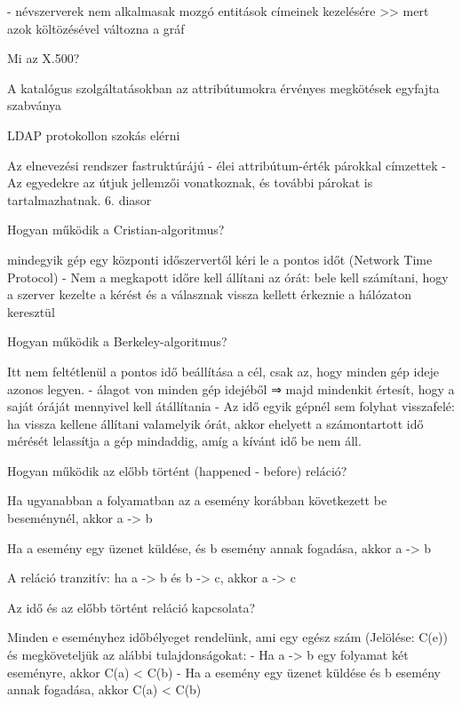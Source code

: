 \documentclass[12pt]{article}
\begin{document}
\begin{description}
            - névszerverek nem alkalmasak mozgó entitások címeinek kezelésére >>  mert azok költözésével változna a gráf
        \item  Mi az X.500?
        \item A katalógus szolgáltatásokban az attribútumokra érvényes megkötések egyfajta szabványa
        \item LDAP protokollon szokás elérni 
        \item Az elnevezési rendszer fastruktúrájú
            - élei attribútum-érték párokkal címzettek
            - Az egyedekre az útjuk jellemzői vonatkoznak, és további párokat is tartalmazhatnak.
            6. diasor
        \item  Hogyan működik a Cristian-algoritmus?
        \item mindegyik gép egy központi időszervertől kéri le a pontos időt (Network Time Protocol)	
            - Nem a megkapott időre kell állítani az órát: bele kell számítani, hogy 
            a szerver kezelte a kérést és a válasznak vissza kellett érkeznie a hálózaton keresztül
        \item  Hogyan működik a Berkeley-algoritmus?
        \item Itt nem feltétlenül a pontos idő beállítása a cél, csak az, hogy minden gép ideje azonos legyen.
            - álagot von minden gép idejéből
            ⇒ majd mindenkit értesít, hogy a saját óráját mennyivel kell átállítania
            - Az idő egyik gépnél sem folyhat visszafelé: ha vissza kellene állítani valamelyik órát,
            akkor ehelyett a számontartott idő mérését lelassítja a gép mindaddig, amíg a kívánt idő be nem áll.
        \item  Hogyan működik az előbb történt (happened - before) reláció?
        \item Ha ugyanabban a folyamatban az a esemény korábban következett be beseménynél, akkor a -> b
        \item Ha a esemény egy üzenet küldése, és b esemény annak fogadása, akkor a -> b
        \item A reláció tranzitív:  ha a -> b és b -> c, akkor a -> c
        \item  Az idő és az előbb történt reláció kapcsolata?
        \item Minden e eseményhez időbélyeget rendelünk, ami egy egész szám (Jelölése:  C(e)) és megköveteljük az alábbi tulajdonságokat:
            - Ha a -> b egy folyamat két eseményre, akkor C(a) < C(b)
            - Ha a esemény egy üzenet küldése és b esemény annak fogadása, akkor C(a) < C(b)

\end{description}
\end{document}
